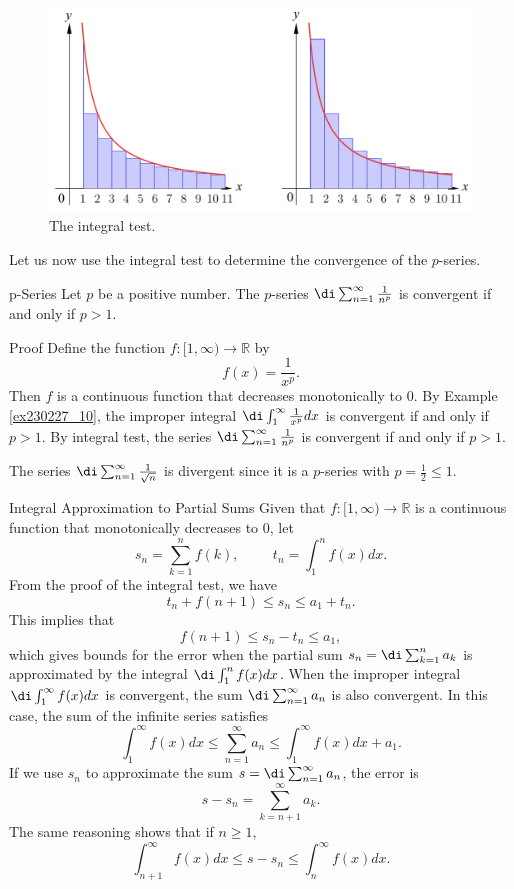 \begin{figure}[ht]
\centering
\includegraphics[scale=0.2]{Picture48.png}
\caption{The integral test.\fa}\label{figure48}
\end{figure}

Let us now use the integral test to determine the convergence of the $p$-series.
\begin{theorem}{p-Series}
Let $p$ be a positive number. The $p$-series $\di\sum_{n=1}^{\infty}\frac{1}{n^p}$ is convergent if and only if $p>1$.

\end{theorem}
\begin{myproof}{Proof}
Define the function $f:[1,\infty)\to\mathbb{R}$ by 
\[f(x)=\frac{1}{x^p}.\] Then $f$ is a continuous function that decreases monotonically to 0. By Example \ref{ex230227_10}, the improper integral $\di \int_1^{\infty}\frac{1}{x^p}dx$ is convergent if and only if $p>1$. By integral test, the series $\di\sum_{n=1}^{\infty}\frac{1}{n^p}$ is convergent if and only if $p>1$.
\end{myproof}

\begin{example}{}
The series $\di\sum_{n=1}^{\infty}\frac{1}{\sqrt{n}}$ is divergent since it is a $p$-series with $p=\frac{1}{2}\leq 1$.
\end{example}
\begin{remark}
{Integral Approximation to Partial Sums}
Given that $f:[1,\infty)\to\mathbb{R}$ is a continuous function that monotonically decreases to 0, let 
\[s_n=\sum_{k=1}^n f(k),\hspace{1cm} t_n=\int_1^nf(x)dx.\] 
From  the proof of the integral test, we have
\[t_n+f(n+1)\leq s_n\leq a_1+t_n.\]This implies that
\[f(n+1)\leq s_n-t_n\leq a_1,\]which gives bounds for the error when   the partial sum $s_n=\di\sum_{k=1}^na_k$ is approximated by the integral $\di\int_1^nf(x)dx$.
When the improper integral $\di\int_1^{\infty}f(x)dx$ is convergent, the sum $\di\sum_{n=1}^{\infty}a_n$ is also convergent. In this case, the sum of the infinite series satisfies
\[\int_1^{\infty}f(x)dx\leq \sum_{n=1}^{\infty}a_n\leq \int_1^{\infty}f(x)dx+a_1.\]
 If we use $s_n$ to approximate the sum $s=\di\sum_{n=1}^{\infty}a_n$, the error is
\[s-s_n=\sum_{k=n+1}^{\infty}a_k.\]
The same reasoning shows that if $n\geq 1$,
\[\int_{n+1}^{\infty}f(x)dx\leq s-s_n\leq\int_n^{\infty}f(x)dx.\]
\end{remark}

